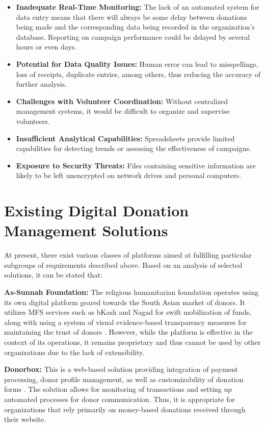 \documentclass{thesis-library}
\begin{document}
\begin{itemize}
    \item \textbf{Inadequate Real-Time Monitoring:} The lack of an automated system for data entry means that there will always be some delay between donations being made and the corresponding data being recorded in the organization's database. Reporting on campaign performance could be delayed by several hours or even days.
    \item \textbf{Potential for Data Quality Issues:} Human error can lead to misspellings, loss of receipts, duplicate entries, among others, thus reducing the accuracy of further analysis.
    \item \textbf{Challenges with Volunteer Coordination:} Without centralized management systems, it would be difficult to organize and supervise volunteers.
    \item \textbf{Insufficient Analytical Capabilities:} Spreadsheets provide limited capabilities for detecting trends or assessing the effectiveness of campaigns.
    \item \textbf{Exposure to Security Threats:} Files containing sensitive information are likely to be left unencrypted on network drives and personal computers.
\end{itemize}

\setlength{\parindent}{0pt}

\section{Existing Digital Donation Management Solutions}

At present, there exist various classes of platforms aimed at fulfilling particular subgroups of requirements described above. Based on an analysis of selected solutions, it can be stated that:

\textbf{As-Sunnah Foundation:} The religious humanitarian foundation operates using its own digital platform geared towards the South Asian market of donors. It utilizes MFS services such as bKash and Nagad for swift mobilization of funds, along with using a system of visual evidence-based transparency measures for maintaining the trust of donors \cite{assunnah2025digital}. However, while the platform is effective in the context of its operations, it remains proprietary and thus cannot be used by other organizations due to the lack of extensibility.

\textbf{Donorbox:} This is a web-based solution providing integration of payment processing, donor profile management, as well as customizability of donation forms \cite{barnes2018rise}. The solution allows for monitoring of transactions and setting up automated processes for donor communication. Thus, it is appropriate for organizations that rely primarily on money-based donations received through their website.
\end{document}
